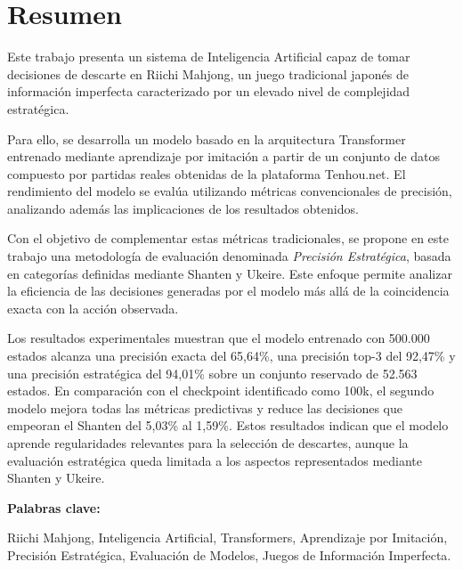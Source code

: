 \section*{Resumen}

Este trabajo presenta un sistema de Inteligencia Artificial capaz de tomar decisiones de descarte en Riichi Mahjong, un juego tradicional japonés de información imperfecta caracterizado por un elevado nivel de complejidad estratégica.

Para ello, se desarrolla un modelo basado en la arquitectura Transformer entrenado mediante aprendizaje por imitación a partir de un conjunto de datos compuesto por partidas reales obtenidas de la plataforma Tenhou.net. El rendimiento del modelo se evalúa utilizando métricas convencionales de precisión, analizando además las implicaciones de los resultados obtenidos.

Con el objetivo de complementar estas métricas tradicionales, se propone en este trabajo una metodología de evaluación denominada \textit{Precisión Estratégica}, basada en categorías definidas mediante Shanten y Ukeire. Este enfoque permite analizar la eficiencia de las decisiones generadas por el modelo más allá de la coincidencia exacta con la acción observada.

Los resultados experimentales muestran que el modelo entrenado con 500.000 estados alcanza una precisión exacta del 65,64\%, una precisión top-3 del 92,47\% y una precisión estratégica del 94,01\% sobre un conjunto reservado de 52.563 estados. En comparación con el checkpoint identificado como 100k, el segundo modelo mejora todas las métricas predictivas y reduce las decisiones que empeoran el Shanten del 5,03\% al 1,59\%. Estos resultados indican que el modelo aprende regularidades relevantes para la selección de descartes, aunque la evaluación estratégica queda limitada a los aspectos representados mediante Shanten y Ukeire.

\vspace{0.5cm}

\textbf{Palabras clave:}

Riichi Mahjong,
Inteligencia Artificial,
Transformers,
Aprendizaje por Imitación,
Precisión Estratégica,
Evaluación de Modelos,
Juegos de Información Imperfecta.
